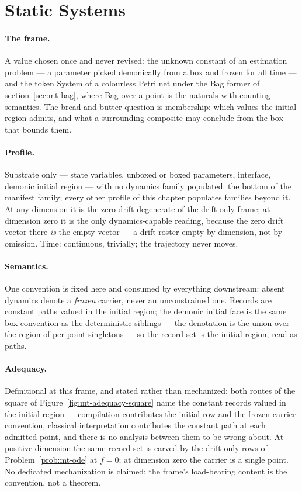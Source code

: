 \section{Static Systems}
\label{sec:mt-static}

\paragraph{The frame.} A value chosen once and never revised: the
unknown constant of an estimation problem --- a parameter picked
demonically from a box and frozen for all time --- and the token
System of a colourless Petri net under the Bag former of
section~\ref{sec:mt-bag}, where Bag over a point is the naturals
with counting semantics. The bread-and-butter question is
membership: which values the initial region admits, and what a
surrounding composite may conclude from the box that bounds them.

\paragraph{Profile.} Substrate only --- state variables, unboxed or
boxed parameters, interface, demonic initial region --- with no
dynamics family populated: the bottom of the manifest family; every
other profile of this chapter populates families beyond it. At any
dimension it is the zero-drift degenerate of the drift-only frame;
at dimension zero it is the only dynamics-capable reading, because
the zero drift vector there \emph{is} the empty vector --- a drift roster
empty by dimension, not by omission. Time: continuous, trivially;
the trajectory never moves.

\paragraph{Semantics.} One convention is fixed here and consumed by
everything downstream: absent dynamics denote a \emph{frozen}
carrier, never an unconstrained one. Records are constant paths
valued in the initial region; the demonic initial face is the same
box convention as the deterministic siblings --- the denotation is
the union over the region of per-point singletons --- so the record
set is the initial region, read as paths.

\paragraph{Adequacy.} Definitional at this frame, and stated rather
than mechanized: both routes of the square of
Figure~\ref{fig:mt-adequacy-square} name the constant records valued
in the initial region --- compilation contributes the initial row
and the frozen-carrier convention, classical interpretation
contributes the constant path at each admitted point, and there is
no analysis between them to be wrong about. At positive dimension
the same record set is carved by the drift-only rows of
Problem~\ref{prob:mt-ode} at $f = 0$; at dimension zero the carrier
is a single point. No dedicated mechanization is claimed: the
frame's load-bearing content is the convention, not a theorem.

